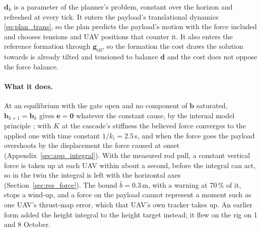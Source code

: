 $\mathbf{d}_k$ is a parameter of the planner's problem, constant over the horizon and refreshed at every
tick. It enters the payload's translational dynamics \eqref{eq:plan_trans}, so the plan predicts the
payload's motion with the force included and chooses tensions and UAV positions that counter it. It also
enters the reference formation through $\mathbf{g}_{\mathrm{eff}}$, so the formation the cost draws the
solution towards is already tilted and tensioned to balance $\mathbf{d}$ and the cost does not oppose the
force balance.

\paragraph{What it does.} At an equilibrium with the gate open and no component of $\mathbf{b}$ saturated,
$\mathbf{b}_{k+1} = \mathbf{b}_k$ gives $\mathbf{e} = \mathbf{0}$ whatever the constant cause, by the internal model
principle \cite{francis1976internal}; with $K$ at the cascade's stiffness the believed force converges to the applied
one with time constant $1/k_i = 2.5$\,s, and when the force goes the payload overshoots by the displacement the force
caused at onset (Appendix~\ref{sec:app_integral}). With the measured rod pull, a constant vertical force is taken up at
each UAV within about a second, before the integral can act, so in the twin the integral is left with the horizontal
axes (Section~\ref{sec:res_force}). The bound $\bar{b} = 0.3$\,m, with a warning at 70\,\% of it, stops a wind-up, and a
force on the payload cannot represent a moment such as one UAV's thrust-map error, which that UAV's own tracker takes up.
An earlier form added the height integral to the height target instead; it flew on the rig on 1 and 8 October.
